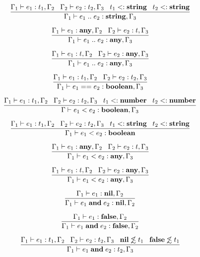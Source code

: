 \[
\dfrac{\Gamma_{1} \vdash e_{1}:t_{1}, \Gamma_{2} \;\;\;
       \Gamma_{2} \vdash e_{2}:t_{2}, \Gamma_{3} \;\;\;
       t_{1} <: \mathbf{string} \;\;\;
       t_{2} <: \mathbf{string}}
      {\Gamma_{1} \vdash e_{1} \; {..} \; e_{2}:\mathbf{string}, \Gamma_{3}}
\]

\[
\dfrac{\Gamma_{1} \vdash e_{1}:\mathbf{any}, \Gamma_{2} \;\;\;
       \Gamma_{2} \vdash e_{2}:t, \Gamma_{3}}
      {\Gamma_{1} \vdash e_{1} \; {..} \; e_{2}:\mathbf{any}, \Gamma_{3}}
\]

\[
\dfrac{\Gamma_{1} \vdash e_{1}:t, \Gamma_{2} \;\;\;
       \Gamma_{2} \vdash e_{2}:\mathbf{any}, \Gamma_{3}}
      {\Gamma_{1} \vdash e_{1} \; {..} \; e_{2}:\mathbf{any}, \Gamma_{3}}
\]

\[
\dfrac{\Gamma_{1} \vdash e_{1}:t_{1}, \Gamma_{2} \;\;\;
       \Gamma_{2} \vdash e_{2}:t_{2}, \Gamma_{3}}
      {\Gamma_{1} \vdash e_{1} == e_{2}:\mathbf{boolean}, \Gamma_{3}}
\]

\[
\dfrac{\Gamma_{1} \vdash e_{1}:t_{1}, \Gamma_{2} \;\;\;
       \Gamma_{2} \vdash e_{2}:t_{2}, \Gamma_{3} \;\;\;
       t_{1} <: \mathbf{number} \;\;\;
       t_{2} <: \mathbf{number}}
      {\Gamma \vdash e_{1} < e_{2}:\mathbf{boolean}, \Gamma_{3}}
\]

\[
\dfrac{\Gamma_{1} \vdash e_{1}:t_{1}, \Gamma_{2} \;\;\;
       \Gamma_{2} \vdash e_{2}:t_{2}, \Gamma_{3} \;\;\;
       t_{1} <: \mathbf{string} \;\;\;
       t_{2} <: \mathbf{string}}
      {\Gamma_{1} \vdash e_{1} < e_{2}:\mathbf{boolean}}
\]

\[
\dfrac{\Gamma_{1} \vdash e_{1}:\mathbf{any}, \Gamma_{2} \;\;\;
       \Gamma_{2} \vdash e_{2}:t, \Gamma_{3}}
      {\Gamma_{1} \vdash e_{1} < e_{2}:\mathbf{any}, \Gamma_{3}}
\]

\[
\dfrac{\Gamma_{1} \vdash e_{1}:t, \Gamma_{2} \;\;\;
       \Gamma_{2} \vdash e_{2}:\mathbf{any}, \Gamma_{3}}
      {\Gamma_{1} \vdash e_{1} < e_{2}:\mathbf{any}, \Gamma_{3}}
\]

\[
\dfrac{\Gamma_{1} \vdash e_{1}:\mathbf{nil}, \Gamma_{2}}
      {\Gamma_{1} \vdash e_{1} \; \mathbf{and} \; e_{2}:\mathbf{nil}, \Gamma_{2}}
\]

\[
\dfrac{\Gamma_{1} \vdash e_{1}:\mathbf{false}, \Gamma_{2}}
      {\Gamma_{1} \vdash e_{1} \; \mathbf{and} \; e_{2}:\mathbf{false}, \Gamma_{2}}
\]

\[
\dfrac{\Gamma_{1} \vdash e_{1}:t_{1}, \Gamma_{2} \;\;\;
       \Gamma_{2} \vdash e_{2}:t_{2}, \Gamma_{3} \;\;\;
       \mathbf{nil} \not\lesssim t_{1} \;\;\;
       \mathbf{false} \not\lesssim t_{1}}
      {\Gamma_{1} \vdash e_{1} \; \mathbf{and} \; e_{2}:t_{2}, \Gamma_{3}}
\]

